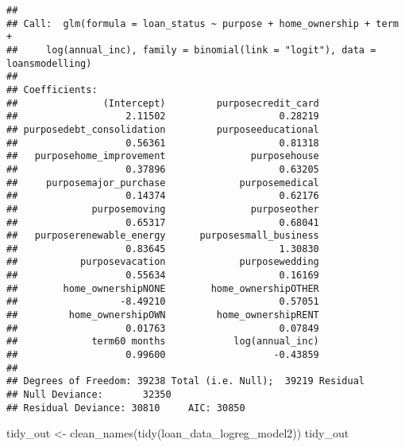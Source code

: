 \documentclass[
]{article}
\newenvironment{Shaded}{\begin{snugshade}}{\end{snugshade}}
\newcommand{\FunctionTok}[1]{\textcolor[rgb]{0.00,0.00,0.00}{#1}}
\newcommand{\NormalTok}[1]{#1}
\newcommand{\OtherTok}[1]{\textcolor[rgb]{0.56,0.35,0.01}{#1}}
\begin{document}
\begin{verbatim}
## 
## Call:  glm(formula = loan_status ~ purpose + home_ownership + term + 
##     log(annual_inc), family = binomial(link = "logit"), data = loansmodelling)
## 
## Coefficients:
##               (Intercept)         purposecredit_card  
##                   2.11502                    0.28219  
## purposedebt_consolidation         purposeeducational  
##                   0.56361                    0.81318  
##   purposehome_improvement               purposehouse  
##                   0.37896                    0.63205  
##     purposemajor_purchase             purposemedical  
##                   0.14374                    0.62176  
##             purposemoving               purposeother  
##                   0.65317                    0.68041  
##   purposerenewable_energy      purposesmall_business  
##                   0.83645                    1.30830  
##           purposevacation             purposewedding  
##                   0.55634                    0.16169  
##        home_ownershipNONE        home_ownershipOTHER  
##                  -8.49210                    0.57051  
##         home_ownershipOWN         home_ownershipRENT  
##                   0.01763                    0.07849  
##             term60 months            log(annual_inc)  
##                   0.99600                   -0.43859  
## 
## Degrees of Freedom: 39238 Total (i.e. Null);  39219 Residual
## Null Deviance:       32350 
## Residual Deviance: 30810     AIC: 30850
\end{verbatim}

\begin{Shaded}
\begin{Highlighting}[]
\NormalTok{tidy\_out }\OtherTok{\textless{}{-}} \FunctionTok{clean\_names}\NormalTok{(}\FunctionTok{tidy}\NormalTok{(loan\_data\_logreg\_model2))}
\NormalTok{tidy\_out}
\end{Highlighting}
\end{Shaded}
\end{document}
